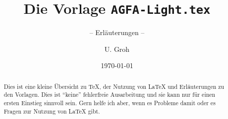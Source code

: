 \documentclass[%
	,ngerman
	,toc			= bib
	,abstract		= true
	,parskip			= half+
	,abstract 		= true
	]{scrartcl}
\title{Die Vorlage \texttt{AGFA-Light.tex}}
\subtitle{-- Erläuterungen --}
\date{\today}
\author{U. Groh}
\begin{document}

\maketitle
\tableofcontents
\thispagestyle{empty}


\begin{abstract}
Dies ist eine kleine Übersicht zu \TeX{}, der Nutzung von \LaTeX{} und Erläuterungen zu den Vorlagen.
Dies ist \enquote{keine} fehlerfreie Ausarbeitung und sie kann nur für einen ersten Einstieg sinnvoll sein.
Gern helfe ich aber, wenn es Probleme damit oder es Fragen zur Nutzung von \LaTeX{} gibt.
\end{abstract}




\RaggedRight
\nocite{voss:2012a,lamport:1986}
\printbibliography
%
\end{document}
